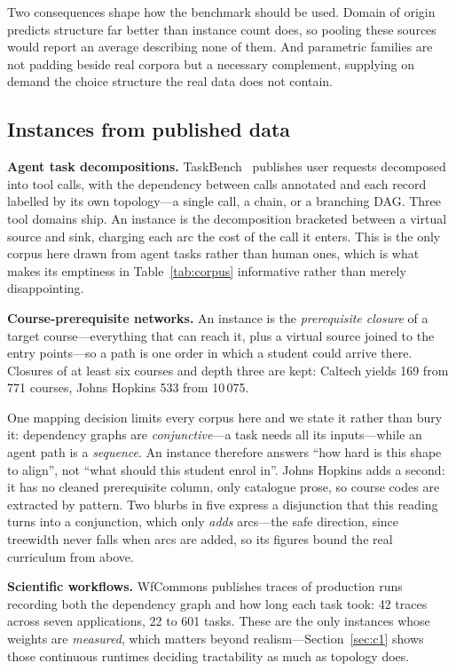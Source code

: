 \documentclass[10pt]{article}
\begin{document}
Two consequences shape how the benchmark should be used. Domain of origin predicts
structure far better than instance count does, so pooling these sources would report
an average describing none of them. And parametric families are not padding beside
real corpora but a necessary complement, supplying on demand the choice structure
the real data does not contain.

\subsection{Instances from published data}

\textbf{Agent task decompositions.} TaskBench~\cite{taskbench} publishes user
requests decomposed into tool calls, with the dependency between calls annotated and
each record labelled by its own topology---a single call, a chain, or a branching
DAG. Three tool domains ship. An instance is the decomposition bracketed between a
virtual source and sink, charging each arc the cost of the call it enters. This is
the only corpus here drawn from agent tasks rather than human ones, which is what
makes its emptiness in Table~\ref{tab:corpus} informative rather than merely
disappointing.

\textbf{Course-prerequisite networks.} An instance is the \emph{prerequisite
closure} of a target course---everything that can reach it, plus a virtual source
joined to the entry points---so a path is one order in which a student could arrive
there. Closures of at least six courses and depth three are kept: Caltech yields 169
from 771 courses, Johns Hopkins 533 from 10\,075.

One mapping decision limits every corpus here and we state it rather than bury it:
dependency graphs are \emph{conjunctive}---a task needs all its inputs---while an
agent path is a \emph{sequence}. An instance therefore answers ``how hard is this
shape to align'', not ``what should this student enrol in''. Johns Hopkins adds a
second: it has no cleaned prerequisite column, only catalogue prose, so course codes
are extracted by pattern. Two blurbs in five express a disjunction that this reading
turns into a conjunction, which only \emph{adds} arcs---the safe direction, since
treewidth never falls when arcs are added, so its figures bound the real curriculum
from above.

\textbf{Scientific workflows.} WfCommons publishes traces of production runs
recording both the dependency graph and how long each task took: 42 traces across
seven applications, 22 to 601 tasks. These are the only instances whose weights are
\emph{measured}, which matters beyond realism---Section~\ref{sec:c1} shows those
continuous runtimes deciding tractability as much as topology does.
\end{document}
